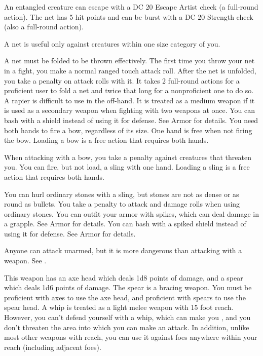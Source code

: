 \par An entangled creature can escape with a DC 20 Escape Artist check (a full-round action). The net has 5 hit points and can be burst with a DC 20 Strength check (also a full-round action).
\par A net is useful only against creatures within one size category of you.
\par A net must be folded to be thrown effectively. The first time you throw your net in a fight, you make a normal ranged touch attack roll. After the net is unfolded, you take a  penalty on attack rolls with it. It takes 2 full-round actions for a proficient user to fold a net and twice that long for a nonproficient one to do so.
 A rapier is difficult to use in the off-hand. It is treated as a medium weapon if it is used as a secondary weapon when fighting with two weapons at once.
 You can bash with a shield instead of using it for defense. See Armor for details.
 You need both hands to fire a bow, regardless of its size. One hand is free when not firing the bow. Loading a bow is a free action that requires both hands.
\par When attacking with a bow, you take a  penalty against creatures that threaten you.
 You can fire, but not load, a sling with one hand. Loading a sling is a free action that requires both hands.
\par You can hurl ordinary stones with a sling, but stones are not as dense or as round as bullets. You take a  penalty to attack and damage rolls when using ordinary stones.
 You can outfit your armor with spikes, which can deal damage in a grapple. See Armor for details.
 You can bash with a spiked shield instead of using it for defense. See Armor for details.

 Anyone can attack unarmed, but it is more dangerous than attacking with a weapon. See .

 This weapon has an axe head which deals 1d8 points of damage, and a spear which deals 1d6 points of damage. The spear is a bracing weapon. You must be proficient with axes to use the axe head, and proficient with spears to use the spear head.
 A whip is treated as a light melee weapon with 15 foot reach. However, you can't defend yourself with a whip, which can make you , and you don't threaten the area into which you can make an attack. In addition, unlike most other weapons with reach, you can use it against foes anywhere within your reach (including adjacent foes).

